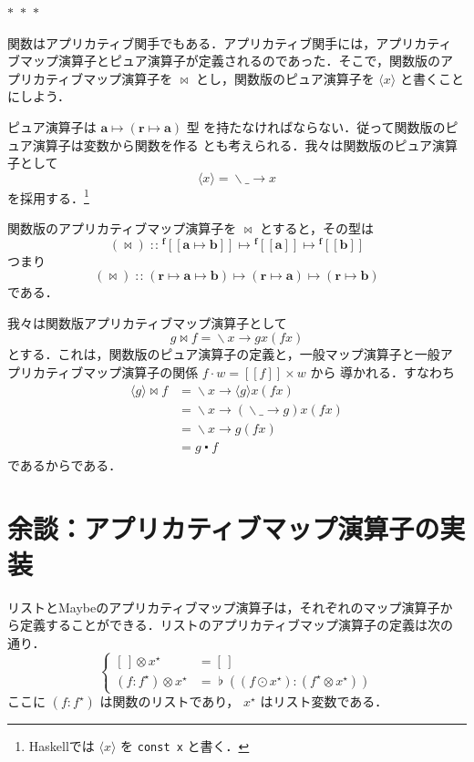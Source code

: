 \documentclass[a5paper,twoside,fleqn,draft]{jsbook}
\def\[{[\![}
\def\]{]\!]}
\newcommand{\separator}{\begin{center}$*$~$*$~$*$\end{center}}
\newcommand{\programminglanguage}[1]{\textsf{#1}}
\newcommand{\haskell}{\programminglanguage{Haskell}}
\newcommand{\code}[1]{\texttt{#1}}
\newcommand{\mEmptyList}{{[\,]}}
\DeclareMathOperator{\mAppMap}{\times}
\DeclareMathOperator{\mAppMapFunc}{\bowtie}
\DeclareMathOperator{\mAppMapList}{\otimes}
\DeclareMathOperator{\mComp}{\centerdot}
\DeclareMathOperator{\mIn}{{:\!:}}
\DeclareMathOperator{\mJoinList}{\flat} %
\DeclareMathOperator{\mLambda}{\backslash}
\DeclareMathOperator{\mLambdaArrow}{\rightarrow}
\DeclareMathOperator{\mMap}{\cdot}
\DeclareMathOperator{\mMapList}{\odot}
\DeclareMathOperator{\mMapsTo}{\mapsto}
\newcommand{\mType}[1]{\mathbf{#1}} %
\newcommand{\mA}{\mType{a}}
\newcommand{\mB}{\mType{b}}
\newcommand{\mR}{\mType{r}}
\newcommand{\mTypeAssemble}[2]{{}^\mType{#1}\[\mType{#2}\]}
\newcommand{\mFuncWith}[1]{\langle#1\rangle}
\newcommand{\mPureWith}[1]{\[#1\]}
\newcommand{\mList}[1]{{#1}^\mathrm{\star}}
\newcommand{\mLambdaEXP}[2]{\mLambda{#1}\mLambdaArrow{#2}} %
\newcommand{\mProjEXP}[2]{#1\mMapsTo#2} %
\begin{document}
\separator

関数はアプリカティブ関手でもある．アプリカティブ関手には，アプリカティ
ブマップ演算子とピュア演算子が定義されるのであった．そこで，関数版のア
プリカティブマップ演算子を $\mAppMapFunc$ とし，関数版のピュア演算子を
$\mFuncWith{x}$ と書くことにしよう．

ピュア演算子は $\mProjEXP{\mA }{(\mProjEXP{\mR}{\mA })}$ 型
を持たなければならない．従って関数版のピュア演算子は変数から関数を作る
とも考えられる．我々は関数版のピュア演算子として
\begin{equation}
  \mFuncWith{x}
  =\mLambdaEXP{\_}{x}
\end{equation}
を採用する．\footnote{\haskell では $\mFuncWith{x}$ を \code{const x} と書く．}

関数版のアプリカティブマップ演算子を $\mAppMapFunc$ とすると，その型は
\begin{equation}
  (\mAppMapFunc)
  \mIn\mTypeAssemble{f}{\mA\mMapsTo\mB}
  \mMapsTo\mTypeAssemble{f}{\mA}
  \mMapsTo\mTypeAssemble{f}{\mB}
\end{equation}
つまり
\begin{equation}
  (\mAppMapFunc)
  \mIn{}(\mR\mMapsTo\mA\mMapsTo\mB)
  \mMapsTo(\mR\mMapsTo\mA)
  \mMapsTo(\mR\mMapsTo\mB)
\end{equation}
である．

我々は関数版アプリカティブマップ演算子として
\begin{equation}
g\mAppMapFunc f=\mLambdaEXP{x}{gx(fx)}
\end{equation}
とする．これは，関数版のピュア演算子の定義と，一般マップ演算子と一般ア
プリカティブマップ演算子の関係 $f\mMap w=\mPureWith{f}\mAppMap w$ から
導かれる．すなわち
\begin{align}
\mFuncWith{g}\mAppMapFunc f
&=\mLambdaEXP{x}{\mFuncWith{g}x(fx)}\\
&=\mLambdaEXP{x}{(\mLambdaEXP{\_}{g})x(fx)}\\
&=\mLambdaEXP{x}{g(fx)}\\
&=g\mComp f
\end{align}
であるからである．

\section{余談：アプリカティブマップ演算子の実装}

リストとMaybeのアプリカティブマップ演算子は，それぞれのマップ演算子か
ら定義することができる．リストのアプリカティブマップ演算子の定義は次の
通り．
\begin{equation}
  \left\{
  \begin{aligned}
    \mEmptyList\mAppMapList\mList{x}
    &=\mEmptyList\\
    (f:\mList{f})\mAppMapList\mList{x}
    &=\mJoinList{}((f\mMapList\mList{x}):(\mList{f}\mAppMapList\mList{x}))
  \end{aligned}
  \right.
\end{equation}
ここに $(f:\mList{f})$ は関数のリストであり， $\mList{x}$ はリスト変数である．
\end{document}
